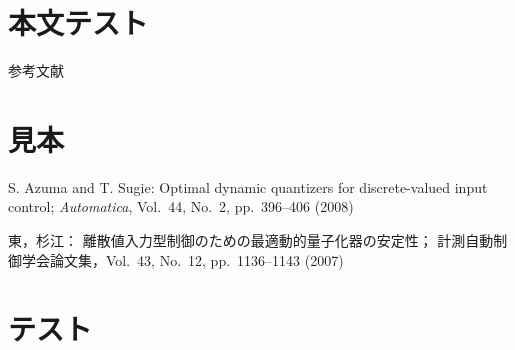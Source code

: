 \documentclass[twocolumn]{jsarticle}
\begin{document}
    \section*{本文テスト}
        参考文献\cite{azuma2008optimal,東俊一2007離散値入力型制御のための最適動的量子化器の安定性}

    \section*{見本}
        \begin{thebibliography}{9}
            S. Azuma and T. Sugie:
            Optimal dynamic quantizers for discrete-valued input control;
            {\it Automatica}, Vol.~44, No.~2, pp.~396--406 (2008)

            東，杉江：
            離散値入力型制御のための最適動的量子化器の安定性；
            計測自動制御学会論文集，Vol.~43, No.~12, pp.~1136--1143 (2007)





        \end{thebibliography}

    \section*{テスト}
        
        









        
\end{document}
